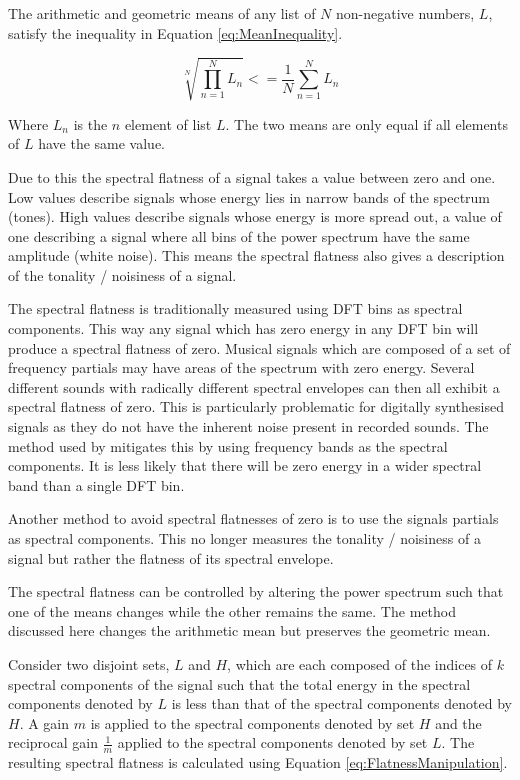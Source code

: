 		The arithmetic and geometric means of any list of $N$ non-negative numbers, $L$, satisfy the inequality in
		Equation \ref{eq:MeanInequality}.

		\begin{equation}
			\sqrt[N]{\prod_{n = 1}^{N} L_{n}} <= \frac{1}{N} \sum_{n = 1}^{N} L_{n}
			\label{eq:MeanInequality}
		\end{equation}

		Where $L_{n}$ is the $n$ element of list $L$. The two means are only equal if all elements of $L$
		have the same value.

		Due to this the spectral flatness of a signal takes a value between zero and one. Low values describe
		signals whose energy lies in narrow bands of the spectrum (tones). High values describe signals whose
		energy is more spread out, a value of one describing a signal where all bins of the power spectrum have the
		same amplitude (white noise). This means the spectral flatness also gives a description of the tonality /
		noisiness of a signal.

		The spectral flatness is traditionally measured using DFT bins as spectral components. This way any signal
		which has zero energy in any DFT bin will produce a spectral flatness of zero. Musical signals which are
		composed of a set of frequency partials may have areas of the spectrum with zero energy. Several different
		sounds with radically different spectral envelopes can then all exhibit a spectral flatness of zero. This
		is particularly problematic for digitally synthesised signals as they do not have the inherent noise
		present in recorded sounds. The method used by \citet{peeters2004a} mitigates this by using frequency bands
		as the spectral components. It is less likely that there will be zero energy in a wider spectral band than
		a single DFT bin. 
		
		Another method to avoid spectral flatnesses of zero is to use the signals partials as spectral components.
		This no longer measures the tonality / noisiness of a signal but rather the flatness of its spectral
		envelope.

		The spectral flatness can be controlled by altering the power spectrum such that one of the means changes
		while the other remains the same. The method discussed here changes the arithmetic mean but preserves the
		geometric mean. 

		Consider two disjoint sets, $L$ and $H$, which are each composed of the indices of $k$ spectral components
		of the signal such that the total energy in the spectral components denoted by $L$ is less than that of the
		spectral components denoted by $H$. A gain $m$ is applied to the spectral components denoted by set $H$ and
		the reciprocal gain $\frac{1}{m}$ applied to the spectral components denoted by set $L$. The resulting
		spectral flatness is calculated using Equation \ref{eq:FlatnessManipulation}.

